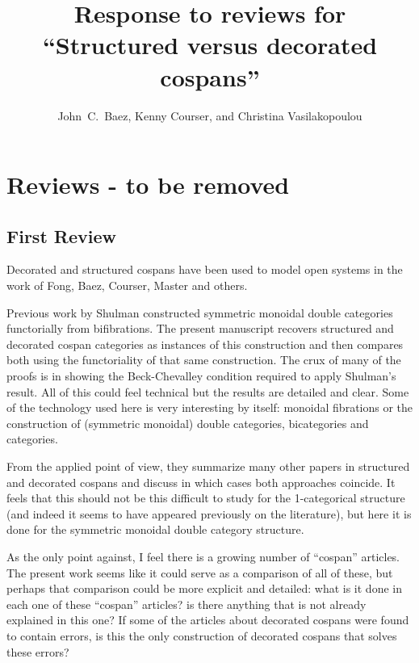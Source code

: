 \documentclass[reqno]{amsart}
\title{Response to reviews for ``Structured versus decorated cospans''}
\author{John\ C.\ Baez, Kenny Courser, and Christina Vasilakopoulou}
\begin{document}
\maketitle

\setcounter{tocdepth}{2}

\iffalse
\section{Reviews - to be removed}

\subsection{First Review}

{\footnotesize

Decorated and structured cospans have been used to model open systems in the work of Fong, Baez, Courser, Master and others.

Previous work by Shulman constructed symmetric monoidal double categories functorially from bifibrations. The present manuscript recovers structured 
and decorated cospan categories as instances of this construction and then compares both using the functoriality of that same construction. The crux 
of many of the proofs is in showing the Beck-Chevalley condition required to apply Shulman’s result. All of this could feel technical but the results 
are detailed and clear. Some of the technology used here is very interesting by itself: monoidal fibrations or the construction of (symmetric 
monoidal) double categories, bicategories and categories.

From the applied point of view, they summarize many other papers in structured and decorated cospans and discuss in which cases both approaches 
coincide. It feels that this should not be this difficult to study for the 1-categorical structure (and indeed it seems to have appeared previously on 
the literature), but here it is done for the symmetric monoidal double category structure.

As the only point against, I feel there is a growing number of “cospan” articles. The present work seems like it could serve as a comparison of all of 
these, but perhaps that comparison could be more explicit and detailed: what is it done in each one of these “cospan” articles? is there anything that 
is not already explained in this one? If some of the articles about decorated cospans were found to contain errors, is this the only construction of 
decorated cospans that solves these errors?

}
\end{document}
